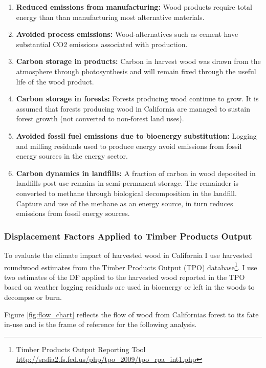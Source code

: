 \documentclass[a4paper]{article}
\begin{document}
\begin{enumerate}
\item \textbf{Reduced emissions from manufacturing:} Wood products require total
energy than than manufacturing most alternative materials.
\item \textbf{Avoided process emissions:} Wood-alternatives such as cement have
substantial CO2 emissions associated with production.
\item \textbf{Carbon storage in products:} Carbon in harvest wood was drawn from
the atmosphere through photosynthesis and will remain fixed through
the useful life of the wood product.
\item \textbf{Carbon storage in forests:} Forests producing wood continue to grow.
It is assumed that forests producing wood in California are managed
to sustain forest growth (not converted to non-forest land uses).
\item \textbf{Avoided fossil fuel emissions due to bioenergy substitution:}
Logging and milling residuals used to produce energy avoid emissions
from fossil energy sources in the energy sector.
\item \textbf{Carbon dynamics in landfills:} A fraction of carbon in wood
deposited in landfills post use remains in semi-permanent storage.
The remainder is converted to methane through biological
decomposition in the landfill. Capture and use of the methane as an
energy source, in turn reduces emissions from fossil energy sources.
\end{enumerate}

\subsubsection{Displacement Factors Applied to Timber Products Output}
\label{sec:orgheadline6}

To evaluate the climate impact of harvested wood in California I use
harvested roundwood estimates from the Timber Products Output (TPO)
database\footnote{Timber Products Output Reporting Tool \href{http://srsfia2.fs.fed.us/php/tpo_2009/tpo_rpa_int1.php}{\url{http://srsfia2.fs.fed.us/php/tpo_2009/tpo_rpa_int1.php}}}. I use two estimates of the DF applied
to the harvested wood reported in the TPO based on weather logging
residuals are used in bioenergy or left in the woods to decompse or
burn.

Figure \ref{fig:flow_chart} reflects the flow of wood
from Californias forest to its fate in-use and is the frame of
reference for the following analysis.
\end{document}
